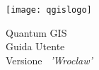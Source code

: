 
\begin{titlepage}
\begin{center}

\begin{center}
\texttt{[image: qgislogo]} 
\end{center}

\Huge{Quantum GIS}\\
\vspace{0.5cm}
\Large{Guida Utente} \\
\vspace{0.5cm}
\Large{Versione ~\CURRENT \textsl{'Wroclaw'}}

\end{center}
\end{titlepage}

